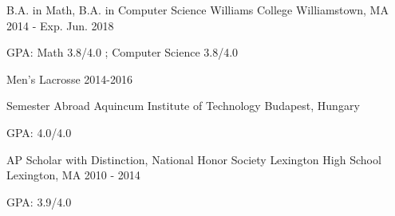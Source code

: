 

\begin{cventries}

\begin{cventry}
  {B.A. in Math, B.A. in Computer Science} %
  {Williams College} %
  {Williamstown, MA} %
  {2014 - Exp. Jun. 2018} %
  {
    \begin{cvitems} %
      \item {GPA: Math 3.8/4.0 ; Computer Science 3.8/4.0}
      \item {Men's Lacrosse 2014-2016}
    \end{cvitems}
  }
\end{cventry}
\cventry
  {Semester Abroad} %
  {Aquincum Institute of Technology} %
  {Budapest, Hungary} %
  {} %
  {
    \begin{cvitems} %
      \item {GPA: 4.0/4.0}\\
    \end{cvitems}
  }

\cventry
  {AP Scholar with Distinction, National Honor Society} %
  {Lexington High School} %
  {Lexington, MA} %
  {2010 - 2014} %
  {
    \begin{cvitems} %
      \item {GPA: 3.9/4.0}
    \end{cvitems}
  }

\end{cventries}
